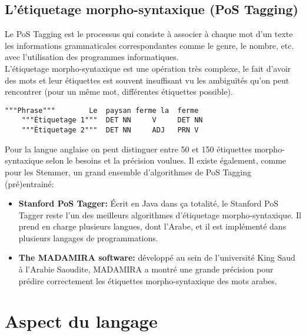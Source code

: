 \documentclass{report}
\begin{document}
\subsection{L'étiquetage morpho-syntaxique (PoS Tagging)}
Le PoS Tagging est le processus qui consiste à associer à chaque mot d'un texte les informations grammaticales correspondantes comme le genre, le nombre, etc. avec l'utilisation des programmes informatiques.\\
L'étiquetage morpho-syntaxique est une opération très complexe, le fait d'avoir des mots et leur étiquettes est souvent insuffisant vu les ambiguïtés qu'on peut rencontrer (pour un même mot, différentes étiquettes possible).
\begin{lstlisting}[style=code]
    """Phrase"""        Le  paysan ferme la  ferme
    """Étiquetage 1"""  DET NN     V     DET NN
    """Étiquetage 2"""  DET NN     ADJ   PRN V
\end{lstlisting}
Pour la langue anglaise on peut distinguer entre 50 et 150 étiquettes morpho-syntaxique selon le besoins et la précision voulues.
Il existe également, comme pour les Stemmer, un grand ensemble d'algorithmes de PoS Tagging (pré)entrainé:
\begin{itemize}
    \item \textbf{Stanford PoS Tagger:} Écrit en Java dans ça totalité, le Stanford PoS Tagger reste l'un des meilleurs algorithmes d'étiquetage morpho-syntaxique. Il prend en charge plusieurs langues, dont l'Arabe, et il est implémenté dans plusieurs langages de programmations. 
    \item \textbf{The MADAMIRA software:} développé au sein de l'université King Saud à l'Arabie Saoudite, MADAMIRA a montré une grande précision pour prédire correctement les étiquettes morpho-syntaxique des mots arabes.
\end{itemize}

\section{Aspect du langage}
\end{document}
